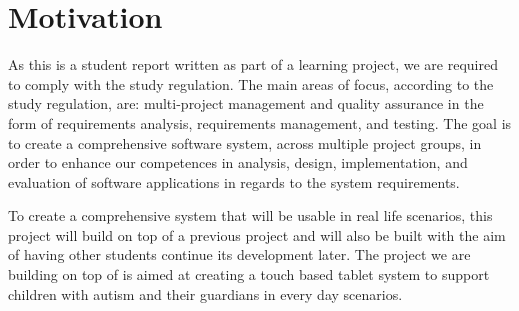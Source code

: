 \section{Motivation}
As this is a student report written as part of a learning project, we are required to comply with the study regulation.
The main areas of focus, according to the study regulation, are: multi-project management and quality assurance in the form of requirements analysis, requirements management, and testing.
The goal is to create a comprehensive software system, across multiple project groups, in order to enhance our competences in analysis, design, implementation, and evaluation of software applications in regards to the system requirements. \cite{studyreg}

To create a comprehensive system that will be usable in real life scenarios, this project will build on top of a previous project and will also be built with the aim of having other students continue its development later.
The project we are building on top of is aimed at creating a touch based tablet system to support children with autism and their guardians in every day scenarios.
